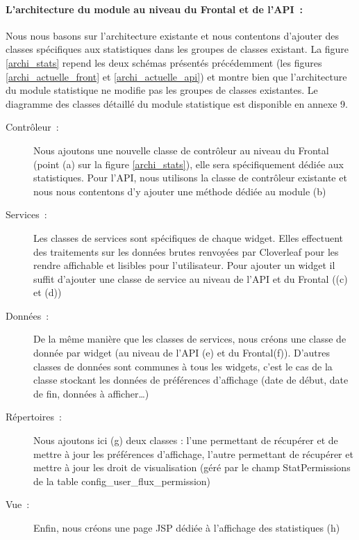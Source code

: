 			\paragraph{L'architecture du module au niveau du Frontal et de l'API~:}
			Nous nous basons sur l'architecture existante et nous contentons d'ajouter
			des classes spécifiques aux statistiques dans les groupes de classes
			existant. La figure \ref{archi_stats} repend les deux schémas présentés
			précédemment (les figures \ref{archi_actuelle_front} et
			\ref{archi_actuelle_api}) et montre bien que l'architecture du module
			statistique ne modifie pas les groupes de classes existantes. Le diagramme
			des classes détaillé du module statistique est disponible en annexe 9.
			\begin{description}
				\item[Contrôleur~:] Nous ajoutons une nouvelle classe de contrôleur au
				niveau du Frontal (point (a) sur la figure \ref{archi_stats}), elle sera
				spécifiquement dédiée aux statistiques. Pour l'API, nous utilisons la
				classe de contrôleur existante et nous nous contentons d'y ajouter une
				méthode dédiée au module (b)
				\item[Services~:] Les classes de services sont spécifiques de chaque widget.
				Elles effectuent des traitements sur les données brutes renvoyées par
				Cloverleaf pour les rendre affichable et lisibles pour l'utilisateur. Pour
				ajouter un widget il suffit d'ajouter une classe de service au niveau de
				l'API et du Frontal ((c) et (d))
				\item[Données~:] De la même manière que les classes de services, nous créons
				une classe de donnée par widget (au niveau de
				l'API (e) et du Frontal(f)). D'autres classes de données sont communes
				à tous les widgets, c'est le cas de la classe stockant les données de
				préférences d'affichage (date de début, date de fin, données à
				afficher\ldots)
				\item[Répertoires~:] Nous ajoutons ici (g) deux classes : l'une permettant
				de récupérer et de mettre à jour les préférences d'affichage, l'autre
				permettant de récupérer et mettre à jour les droit de visualisation (géré
				par le champ StatPermissions de la table config\_user\_flux\_permission)
				\item[Vue~:] Enfin, nous créons une page JSP dédiée à l'affichage des
				statistiques (h)
			\end{description}
